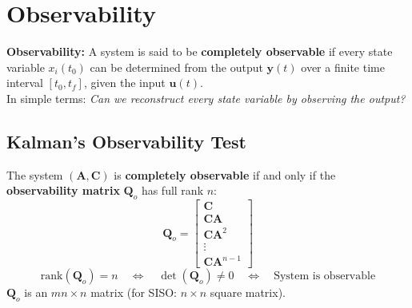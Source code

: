 \documentclass[12pt,a4paper]{article}
\begin{document}
\section{Observability}

\begin{tcolorbox}[defbox]
\textbf{Observability:} A system is said to be \textbf{completely observable} if every state variable $x_i(t_0)$ can be determined from the output $\mathbf{y}(t)$ over a finite time interval $[t_0, t_f]$, given the input $\mathbf{u}(t)$.\\[4pt]
In simple terms: \textit{Can we reconstruct every state variable by observing the output?}
\end{tcolorbox}

\subsection{Kalman's Observability Test}

\begin{tcolorbox}[formulabox, title={Observability Matrix}]
The system $(\mathbf{A}, \mathbf{C})$ is \textbf{completely observable} if and only if the \textbf{observability matrix} $\mathbf{Q}_o$ has full rank $n$:
$$\mathbf{Q}_o = \begin{bmatrix}\mathbf{C}\\\mathbf{C}\mathbf{A}\\\mathbf{C}\mathbf{A}^2\\\vdots\\\mathbf{C}\mathbf{A}^{n-1}\end{bmatrix}$$
$$\text{rank}(\mathbf{Q}_o) = n \quad \Leftrightarrow \quad \det(\mathbf{Q}_o) \neq 0 \quad \Leftrightarrow \quad \text{System is observable}$$
$\mathbf{Q}_o$ is an $mn \times n$ matrix (for SISO: $n \times n$ square matrix).
\end{tcolorbox}
\end{document}
